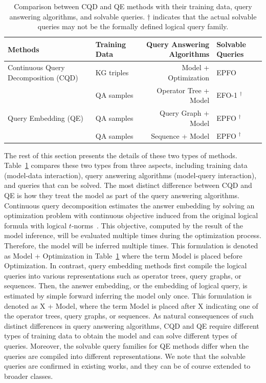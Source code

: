 \documentclass[11pt]{article}
\begin{document}
\begin{table}[t]
\small\centering
\caption{Comparison between CQD and QE methods with their training data, query answering algorithms, and solvable queries. $\dag$ indicates that the actual solvable queries may not be the formally defined logical query family.}\label{tab:compare-method}
\begin{tabular}{llrl}
\toprule
Methods                        & Training Data & Query Answering Algorithms & Solvable Queries \\ \midrule
Continuous Query Decomposition (CQD)  & KG triples  & Model + Optimization  & EPFO             \\\midrule
& QA samples & Operator Tree + Model & EFO-1 $^\dag$ \\
Query Embedding (QE)                                 & QA samples & Query Graph + Model & EPFO $^\dag$ \\
                                 & QA samples & Sequence + Model & EPFO $^\dag$  \\ \bottomrule
\end{tabular}
\end{table}

The rest of this section presents the details of these two types of methods. Table~\ref{tab:compare-method} compares these two types from three aspects, including training data (model-data interaction), query answering algorithms (model-query interaction), and queries that can be solved.
The most distinct difference between CQD and QE is how they treat the model as part of the query answering algorithms.
Continuous query decomposition estimates the answer embedding by solving an optimization problem with continuous objective induced from the original logical formula with logical $t$-norms~\cite{Hajek1998MetamathematicsFuzzy}. This objective, computed by the result of the model inference, will be evaluated multiple times during the optimization process. Therefore, the model will be inferred multiple times. This formulation is denoted as Model + Optimization in Table~\ref{tab:compare-method} where the term Model is placed before Optimization.
In contrast, query embedding methods first compile the logical queries into various representations such as operator trees, query graphs, or sequences. Then, the answer embedding, or the embedding of logical query, is estimated by simple forward inferring the model only once. This formulation is denoted as X + Model, where the term Model is placed after X indicating one of the operator trees, query graphs, or sequences.
As natural consequences of such distinct differences in query answering algorithms, CQD and QE require different types of training data to obtain the model and can solve different types of queries. Moreover, the solvable query families for QE methods differ when the queries are compiled into different representations. We note that the solvable queries are confirmed in existing works, and they can be of course extended to broader classes.
\end{document}
